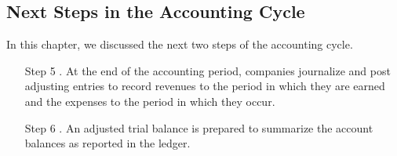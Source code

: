 \documentclass{article}
\begin{document}
\subsection{Next Steps in the Accounting Cycle}

In this chapter, we discussed the next two steps of the accounting cycle. 
\begin{itemize}
  \item[Step 5] . At the end of the accounting period, companies journalize and post adjusting entries to record revenues to the period in which they are earned and the expenses to the period in which they occur. 
  \item[Step 6] . An adjusted trial balance is prepared to summarize the account balances as reported in the ledger. 
\end{itemize}
\end{document}
